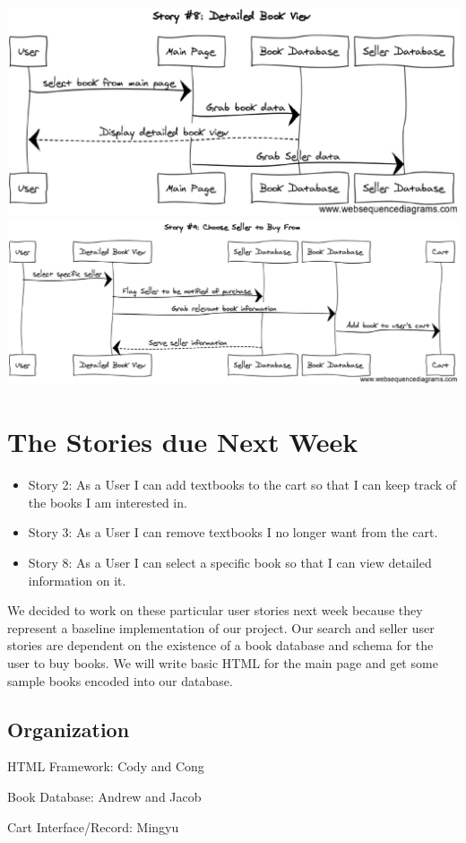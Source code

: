 \documentclass[12pt]{article}
\begin{document}
 		\clearpage
 		\includegraphics[width=16cm]{story8.eps}
 		\clearpage
 		\includegraphics[width=17cm]{story9.eps}



	\section{The Stories due Next Week}
		\begin{itemize}
		\item Story 2: As a User I can add textbooks to the cart so that I can keep track of the books I am interested in.

		\item Story 3: As a User I can remove textbooks I no longer want from the cart.

		\item Story 8: As a User I can select a specific book so that I can view detailed information on it.
		\end{itemize}
		We decided to work on these particular user stories next week because they represent a baseline implementation of our project. 
		Our search and seller user stories are dependent on the existence of a book database and schema for the user to buy books. 
		We will write basic HTML for the main page and get some sample books encoded into our database.
		\subsection{Organization}
		HTML Framework: Cody and Cong \par
		Book Database: Andrew and Jacob \par
		Cart Interface/Record: Mingyu \par
\end{document}
